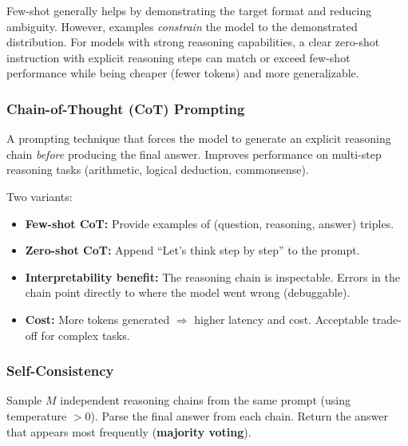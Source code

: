 \documentclass[11pt, a4paper]{article}
\begin{document}
\begin{notebox}
Few-shot generally helps by demonstrating the target format and reducing ambiguity. However, examples \emph{constrain} the model to the demonstrated distribution. For models with strong reasoning capabilities, a clear zero-shot instruction with explicit reasoning steps can match or exceed few-shot performance while being cheaper (fewer tokens) and more generalizable.
\end{notebox}

\subsubsection{Chain-of-Thought (CoT) Prompting}

\begin{defbox}
A prompting technique that forces the model to generate an explicit reasoning chain \emph{before} producing the final answer. Improves performance on multi-step reasoning tasks (arithmetic, logical deduction, commonsense).

Two variants:
\begin{itemize}[leftmargin=1.5em]
  \item \textbf{Few-shot CoT:} Provide examples of (question, reasoning, answer) triples.
  \item \textbf{Zero-shot CoT:} Append ``Let's think step by step'' to the prompt.
\end{itemize}
\end{defbox}

\begin{itemize}[leftmargin=2em]
  \item \textbf{Interpretability benefit:} The reasoning chain is inspectable. Errors in the chain point directly to where the model went wrong (debuggable).
  \item \textbf{Cost:} More tokens generated $\Rightarrow$ higher latency and cost. Acceptable trade-off for complex tasks.
\end{itemize}

\subsubsection{Self-Consistency}

\begin{defbox}
Sample $M$ independent reasoning chains from the same prompt (using temperature $> 0$). Parse the final answer from each chain. Return the answer that appears most frequently (\textbf{majority voting}).
\end{defbox}
\end{document}
